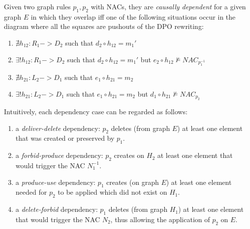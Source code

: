 \begin{definition}\label{def:classic-dependency} Given two graph rules $p_1,p_2$ with NACs, they are \emph{causally dependent} for a given graph $E$ in which they overlap iff one of the following situations occur in the diagram where all the squares are pushouts of the DPO rewriting: 

  \begin{enumerate}
    \item $\nexists h_{12} : R_1 -> D_2$ such that $d_2 \circ h_{12} = m_1'$
    \item $\exists! h_{12} : R_1 -> D_2$ such that $d_2 \circ h_{12} = m_1'$ but $e_2 \circ h_{12} \not\models NAC_{p_1^{-1}}$
    \item $\nexists h_{21} : L_2 -> D_1$ such that $e_1 \circ h_{21} = m_2$
    \item $\exists! h_{21} : L_2 -> D_1$ such that $e_1 \circ h_{21} = m_2$ but $d_1 \circ h_{21} \not\models NAC_{p_2}$
  \end{enumerate}

\end{definition}

Intuitively, each dependency case can be regarded as follows:

\begin{enumerate}
  \item a \emph{deliver-delete} dependency: $p_2$ deletes (from graph $E$) at least one element that was created or preserved by $p_1$.
  \item a \emph{forbid-produce} dependency: $p_2$ creates on $H_2$ at least one element that would trigger the NAC $N_1^{-1}$.
  \item a \emph{produce-use} dependency: $p_1$ creates (on graph $E$) at least one element needed for $p_2$ to be applied which did not exist on $H_1$.
  \item a \emph{delete-forbid} dependency: $p_1$ deletes (from graph $H_1$) at least one element that would trigger the NAC $N_2$, thus allowing the application of $p_2$ on $E$.
\end{enumerate}


